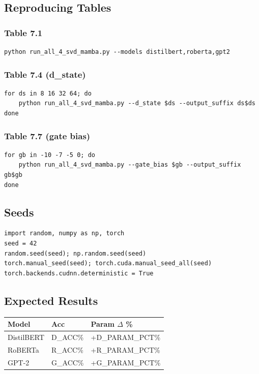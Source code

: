 \subsection{Reproducing Tables}

\subsubsection{Table 7.1}
\begin{lstlisting}
python run_all_4_svd_mamba.py --models distilbert,roberta,gpt2
\end{lstlisting}

\subsubsection{Table 7.4 (d\_state)}
\begin{lstlisting}
for ds in 8 16 32 64; do
    python run_all_4_svd_mamba.py --d_state $ds --output_suffix ds$ds
done
\end{lstlisting}

\subsubsection{Table 7.7 (gate bias)}
\begin{lstlisting}
for gb in -10 -7 -5 0; do
    python run_all_4_svd_mamba.py --gate_bias $gb --output_suffix gb$gb
done
\end{lstlisting}

\subsection{Seeds}

\begin{lstlisting}
import random, numpy as np, torch
seed = 42
random.seed(seed); np.random.seed(seed)
torch.manual_seed(seed); torch.cuda.manual_seed_all(seed)
torch.backends.cudnn.deterministic = True
\end{lstlisting}

\subsection{Expected Results}

\begin{table}[H]
\centering
\small
\begin{tabular}{lll}
\toprule
\textbf{Model} & \textbf{Acc} & \textbf{Param $\Delta$ \%} \\
\midrule
DistilBERT & {{D\_ACC}}\% & +{{D\_PARAM\_PCT}}\% \\
RoBERTa & {{R\_ACC}}\% & +{{R\_PARAM\_PCT}}\% \\
GPT-2 & {{G\_ACC}}\% & +{{G\_PARAM\_PCT}}\% \\
\bottomrule
\end{tabular}
\end{table}

